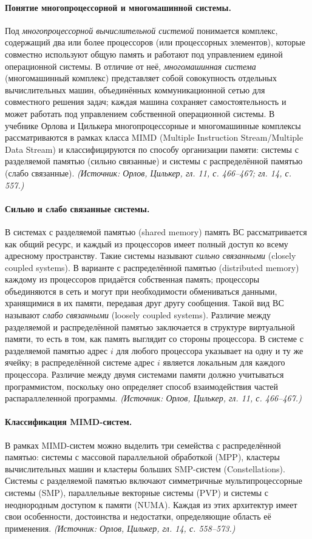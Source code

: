 \documentclass[a4paper,12pt]{article}
\begin{document}
\paragraph{Понятие многопроцессорной и многомашинной системы.}
Под \emph{многопроцессорной вычислительной системой} понимается комплекс, содержащий два или более процессоров (или процессорных элементов), которые совместно используют общую память и работают под управлением единой операционной системы. В отличие от неё, \emph{многомашинная система} (многомашинный комплекс) представляет собой совокупность отдельных вычислительных машин, объединённых коммуникационной сетью для совместного решения задач; каждая машина сохраняет самостоятельность и может работать под управлением собственной операционной системы. В учебнике Орлова и Цилькера многопроцессорные и многомашинные комплексы рассматриваются в рамках класса MIMD (Multiple Instruction Stream/Multiple Data Stream) и классифицируются по способу организации памяти: системы с разделяемой памятью (сильно связанные) и системы с распределённой памятью (слабо связанные).
\textit{(Источник: Орлов, Цилькер, гл. 11, с. 466--467; гл. 14, с. 557.)}

\paragraph{Сильно и слабо связанные системы.}
В системах с разделяемой памятью (shared memory) память ВС рассматривается как общий ресурс, и каждый из процессоров имеет полный доступ ко всему адресному пространству. Такие системы называют \emph{сильно связанными} (closely coupled systems). В варианте с распределённой памятью (distributed memory) каждому из процессоров придаётся собственная память; процессоры объединяются в сеть и могут при необходимости обмениваться данными, хранящимися в их памяти, передавая друг другу сообщения. Такой вид ВС называют \emph{слабо связанными} (loosely coupled systems). Различие между разделяемой и распределённой памятью заключается в структуре виртуальной памяти, то есть в том, как память выглядит со стороны процессора. В системе с разделяемой памятью адрес \(i\) для любого процессора указывает на одну и ту же ячейку; в распределённой системе адрес \(i\) является локальным для каждого процессора. Различие между двумя системами памяти должно учитываться программистом, поскольку оно определяет способ взаимодействия частей распараллеленной программы.
\textit{(Источник: Орлов, Цилькер, гл. 11, с. 466--467.)}

\paragraph{Классификация MIMD-систем.}
В рамках MIMD-систем можно выделить три семейства с распределённой памятью: системы с массовой параллельной обработкой (MPP), кластеры вычислительных машин и кластеры больших SMP-систем (Constellations). Системы с разделяемой памятью включают симметричные мультипроцессорные системы (SMP), параллельные векторные системы (PVP) и системы с неоднородным доступом к памяти (NUMA). Каждая из этих архитектур имеет свои особенности, достоинства и недостатки, определяющие область её применения.
\textit{(Источник: Орлов, Цилькер, гл. 14, с. 558--573.)}
\end{document}
